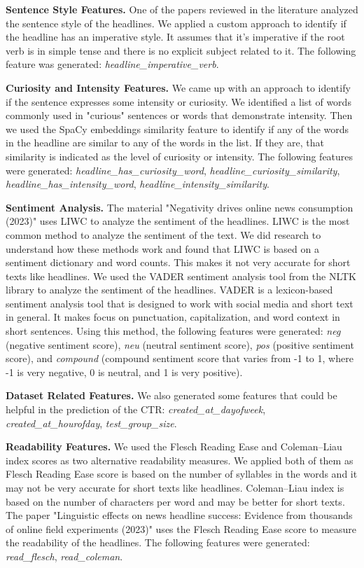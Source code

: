 \documentclass[11pt]{article}
\begin{document}
\textbf{Sentence Style Features.} One of the papers reviewed in the literature analyzed the sentence style of the headlines. We applied a custom approach to identify if the headline has an imperative style. It assumes that it's imperative if the root verb is in simple tense and there is no explicit subject related to it. The following feature was generated: \textit{headline\_imperative\_verb}.

\textbf{Curiosity and Intensity Features.} We came up with an approach to identify if the sentence expresses some intensity or curiosity. We identified a list of words commonly used in "curious" sentences or words that demonstrate intensity. Then we used the SpaCy embeddings similarity feature to identify if any of the words in the headline are similar to any of the words in the list. If they are, that similarity is indicated as the level of curiosity or intensity. The following features were generated: \textit{headline\_has\_curiosity\_word}, \textit{headline\_curiosity\_similarity}, \textit{headline\_has\_intensity\_word}, \textit{headline\_intensity\_similarity}.

\textbf{Sentiment Analysis.} The material "Negativity drives online news consumption (2023)" uses LIWC to analyze the sentiment of the headlines. LIWC is the most common method to analyze the sentiment of the text. We did research to understand how these methods work and found that LIWC is based on a sentiment dictionary and word counts. This makes it not very accurate for short texts like headlines. We used the VADER sentiment analysis tool from the NLTK library to analyze the sentiment of the headlines. VADER is a lexicon-based sentiment analysis tool that is designed to work with social media and short text in general. It makes focus on punctuation, capitalization, and word context in short sentences. Using this method, the following features were generated: \textit{neg} (negative sentiment score), \textit{neu} (neutral sentiment score), \textit{pos} (positive sentiment score), and \textit{compound} (compound sentiment score that varies from -1 to 1, where -1 is very negative, 0 is neutral, and 1 is very positive).

\textbf{Dataset Related Features.} We also generated some features that could be helpful in the prediction of the CTR: \textit{created\_at\_dayofweek}, \textit{created\_at\_hourofday}, \textit{test\_group\_size}.

\textbf{Readability Features.} We used the Flesch Reading Ease and Coleman–Liau index scores as two alternative readability measures. We applied both of them as Flesch Reading Ease score is based on the number of syllables in the words and it may not be very accurate for short texts like headlines. Coleman–Liau index is based on the number of characters per word and may be better for short texts. The paper "Linguistic effects on news headline success: Evidence from thousands of online field experiments (2023)" uses the Flesch Reading Ease score to measure the readability of the headlines. The following features were generated: \textit{read\_flesch}, \textit{read\_coleman}.
\end{document}
